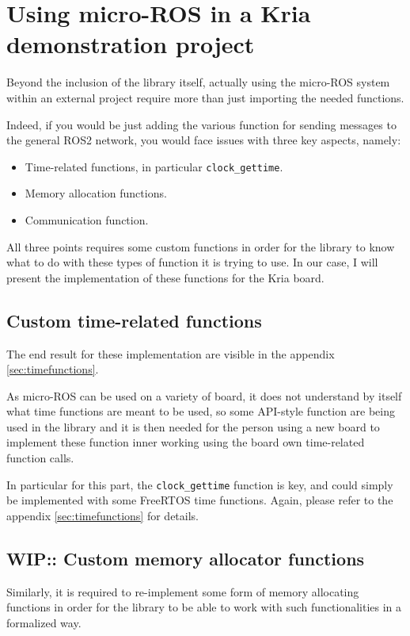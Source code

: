 \documentclass[10pt]{article}
\begin{document}

\section{Using micro-ROS in a Kria demonstration project}
Beyond the inclusion of the library itself, actually using the micro-ROS system
within an external project require more than just importing the needed
functions.

Indeed, if you would be just adding the various function for sending messages to
the general ROS2 network, you would face issues with three key aspects, namely:
\begin{itemize}
\item Time-related functions, in particular \verb|clock_gettime|.
\item Memory allocation functions.
\item Communication function.
\end{itemize}

All three points requires some custom functions in order for the library to
know what to do with these types of function it is trying to use.
In our case, I will present the implementation of these functions for the
Kria board.

\subsection{Custom time-related functions}
The end result for these implementation are visible in the appendix
\ref{sec:timefunctions}.

As micro-ROS can be used on a variety of board, it does not understand by itself
what time functions are meant to be used, so some API-style function are being
used in the library and it is then needed for the person using a new board
to implement these function inner working using the board own time-related
function calls.

In particular for this part, the \verb|clock_gettime| function is key, and could
simply be implemented with some FreeRTOS time functions.
Again, please refer to the appendix \ref{sec:timefunctions} for details.

\subsection{WIP:: Custom memory allocator functions}
Similarly, it is required to re-implement some form of memory allocating
functions in order for the library to be able to work with such functionalities
in a formalized way.
\end{document}

